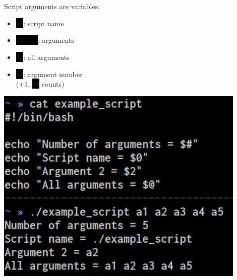 \documentclass[unknownkeysallowed, 10pt, a4 paper, handout]{beamer}
\newcommand{\code}[1]{\colorbox{black}{\color{green}\texttt{#1}}}
\newcommand{\sidebyside}[5]{
  \begin{minipage}{#1\textwidth}
    #2
  \end{minipage} #3 \begin{minipage}{#4\textwidth}
    #5
  \end{minipage}
}
\begin{document}
\begin{frame}
\begin{center}
    \sidebyside{0.50}{
      Script arguments are variables:
      \begin{itemize}
        \item \code{\$0}: script name
        \item \code{\$1-...}: arguments
        \item \code{\$@}: all arguments
        \item \code{\$\#}: argument number\\
          (+1, \code{\$0} counts)
      \end{itemize}
    }{\hfill}{0.43}{
      \begin{center}
        \includegraphics[width=0.90\textwidth]{pics/arguments.png}
      \end{center}
    }
  \end{center}
\end{frame}
\end{document}
